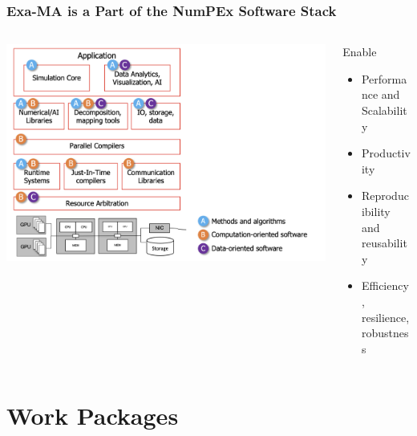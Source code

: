 \begin{frame}
  \frametitle{Exa-MA is a Part of the NumPEx Software Stack}

  \begin{columns}[]
    \begin{column}{.5\linewidth}
      \begin{center}
        \includegraphics[height=.8\textheight]{../../figures/software-stack.png}  
      \end{center}
    \end{column}
    \begin{column}{.5\linewidth}
      Enable
      \begin{itemize}
        \item Performance and Scalability
        \item Productivity
        \item Reproducibility and reusability
        \item Efficiency, resilience, robustness
      \end{itemize}
    \end{column}
  \end{columns}
  
  
\end{frame}
\section{Work Packages}
